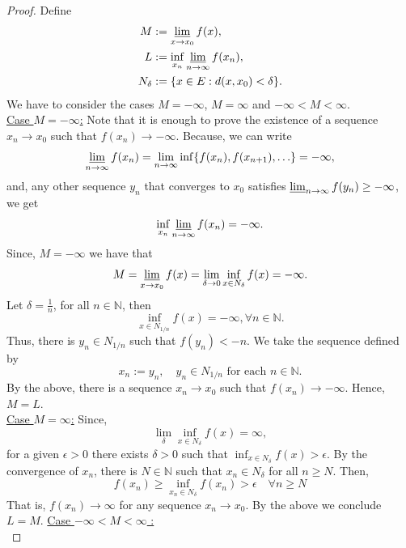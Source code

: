     \begin{proof}
        Define 
        \begin{align*}
            M &:= \varliminf_{x \to x_0} f(x),  \\
            L &:= \inf_{x_n}{\varliminf_{n \to \infty} f(x_n)}, \\
            N_{\delta} &:= \{ x \in E : d(x, x_0) < \delta \}.
        \end{align*}
        We have to consider the cases $M = - \infty$, $M = \infty$ and 
        $ -\infty < M < \infty $. \\
        \underline{Case $M = -\infty$:}
        Note that it is enough to prove the 
        existence of a sequence $x_n \to x_0$ such that $f(x_n) \to - \infty$. 
        Because, we can write
        $$
            \varliminf_{n \to \infty}{f(x_n)} = \lim_{n \to \infty} %
            \inf \{ f(x_n), f(x_{n+1}), \ldots \} = - \infty,
        $$
        and, any other sequence $y_n$ that converges to $x_0$ satisfies
        $\varliminf_{n \to \infty}f(y_n) \geq - \infty$, we get
        $$
            \inf_{x_n} \varliminf_{n \to \infty} f(x_n) = -\infty.
        $$
        Since, $M = -\infty$ we have that
        $$
            M = \varliminf_{x \to x_0} f(x) = \lim_{\delta \to 0} %
            \inf_{x \in N_{\delta}} f(x) = - \infty .
        $$
        Let $\delta = \frac{1}{n}$, for all $n \in \mathbb{N}$, then
        $$
            \inf_{x \in N_{1/n}} f(x) = -\infty, \forall n \in \mathbb{N}.
        $$
        Thus, there is $y_n \in N_{1/n}$ such that $f(y_n) < -n$. We take the 
        sequence defined by 
        $$
            x_n := y_n, \quad y_n \in  N_{1/n} \text{ for each } n \in \mathbb{N}.
        $$
        By the above, there is a sequence $x_n \to x_0$ such that 
        $f(x_n) \to - \infty$. Hence, $M = L$. \\
        \underline{Case $M = \infty$:} Since,
        $$
            \lim_{\delta} \inf_{x \in N_{\delta}} f(x) = \infty, 
        $$
        for a given $\epsilon > 0 $ there exists $\delta > 0 $ such that 
        $\inf_{x \in N_{\delta}} f(x) > \epsilon$.
        By the convergence of $x_n$, there is $N \in \mathbb{N}$ such that 
        $x_n \in N_{\delta}$ for all $n \geq N$. Then, 
        $$
            f(x_n) \geq \inf_{x_n \in N_{\delta}} f(x_n) > %
            \epsilon \quad \forall n \geq N
        $$ 
        That is, $f(x_n) \to \infty$ for any sequence $x_n \to x_0$. By the above
        we conclude $L = M$.
        \underline{Case $ -\infty < M < \infty$ :} \\

\end{proof}
